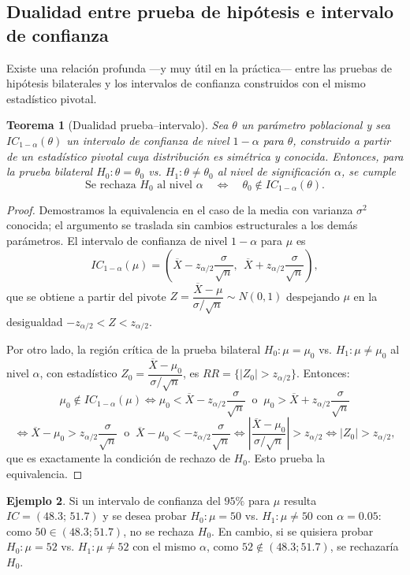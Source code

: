 \documentclass[11pt,a4paper]{article}
\theoremstyle{plain}
\newtheorem{teorema}{Teorema}[section]
\theoremstyle{definition}
\newtheorem{ejemplo}[teorema]{Ejemplo}
\theoremstyle{remark}
\begin{document}
\subsection{Dualidad entre prueba de hipótesis e intervalo de confianza}
\label{sec:dualidad}

Existe una relación profunda —y muy útil en la práctica— entre las pruebas de hipótesis bilaterales y los intervalos de confianza construidos con el mismo estadístico pivotal.

\begin{teorema}[Dualidad prueba--intervalo]
Sea $\theta$ un parámetro poblacional y sea $IC_{1-\alpha}(\theta)$ un intervalo de confianza de nivel $1-\alpha$ para $\theta$, construido a partir de un estadístico pivotal cuya distribución es simétrica y conocida. Entonces, para la prueba bilateral $H_0:\theta=\theta_0$ vs. $H_1:\theta\neq\theta_0$ al nivel de significación $\alpha$, se cumple
\[
\text{Se rechaza } H_0 \text{ al nivel } \alpha \quad \Longleftrightarrow \quad \theta_0\notin IC_{1-\alpha}(\theta).
\]
\end{teorema}

\begin{proof}
Demostramos la equivalencia en el caso de la media con varianza $\sigma^2$ conocida; el argumento se traslada sin cambios estructurales a los demás parámetros. El intervalo de confianza de nivel $1-\alpha$ para $\mu$ es
\[
IC_{1-\alpha}(\mu) = \left(\overline X - z_{\alpha/2}\frac{\sigma}{\sqrt n},\ \ \overline X + z_{\alpha/2}\frac{\sigma}{\sqrt n}\right),
\]
que se obtiene a partir del pivote $Z=\dfrac{\overline X-\mu}{\sigma/\sqrt n}\sim N(0,1)$ despejando $\mu$ en la desigualdad $-z_{\alpha/2}<Z<z_{\alpha/2}$.

Por otro lado, la región crítica de la prueba bilateral $H_0:\mu=\mu_0$ vs. $H_1:\mu\neq\mu_0$ al nivel $\alpha$, con estadístico $Z_0=\dfrac{\overline X-\mu_0}{\sigma/\sqrt n}$, es $RR=\{|Z_0|>z_{\alpha/2}\}$. Entonces:
\[
\mu_0\notin IC_{1-\alpha}(\mu)
\iff \mu_0 < \overline X - z_{\alpha/2}\frac{\sigma}{\sqrt n} \ \text{ o } \ \mu_0>\overline X+z_{\alpha/2}\frac{\sigma}{\sqrt n}
\]
\[
\iff \overline X-\mu_0 > z_{\alpha/2}\frac{\sigma}{\sqrt n} \ \text{ o } \ \overline X - \mu_0 < -z_{\alpha/2}\frac{\sigma}{\sqrt n}
\iff \left|\frac{\overline X-\mu_0}{\sigma/\sqrt n}\right| > z_{\alpha/2}
\iff |Z_0|>z_{\alpha/2},
\]
que es exactamente la condición de rechazo de $H_0$. Esto prueba la equivalencia.
\end{proof}

\begin{ejemplo}
Si un intervalo de confianza del $95\%$ para $\mu$ resulta $IC=(48.3;\,51.7)$ y se desea probar $H_0:\mu=50$ vs. $H_1:\mu\neq50$ con $\alpha=0.05$: como $50\in(48.3;51.7)$, no se rechaza $H_0$. En cambio, si se quisiera probar $H_0:\mu=52$ vs. $H_1:\mu\neq52$ con el mismo $\alpha$, como $52\notin(48.3;51.7)$, se rechazaría $H_0$.
\end{ejemplo}
\end{document}
